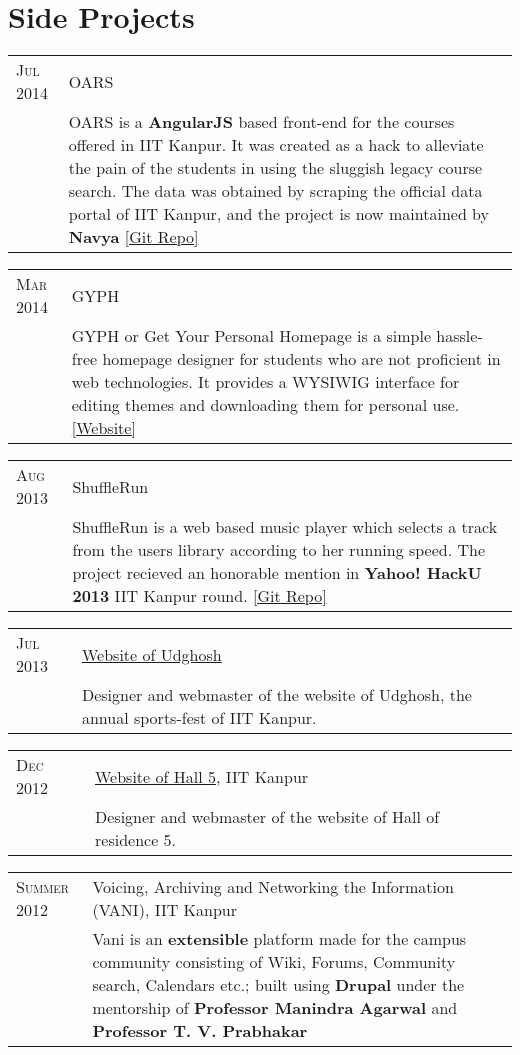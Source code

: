 \documentclass[a4paper,10pt]{article} %
\newcommand{\project}[3]{
    \begin{tabular}{>{\raggedleft}p{2.2cm}|p{17cm}}
        \textsc{#1} & \textcolor{NavyBlue}{#2} \\
                    & \footnotesize{#3} \\
    \end{tabular}
}
\begin{document}
\section{Side Projects}

\project {Jul 2014}
         {OARS}
         {OARS is a \textbf{AngularJS} based front-end for the
          courses offered in IIT Kanpur. It was created as a
          hack to alleviate the pain of the students in using the
          sluggish legacy course search. The data was obtained by
          scraping the official data portal of IIT Kanpur, and the
          project is now maintained by \textbf{Navya}
          \href{https://github.com/navya/oars} {[Git Repo]} }

\project {Mar 2014}
         {GYPH}
         {GYPH or Get Your Personal Homepage
          is a simple hassle-free homepage designer for students who are not
          proficient in web technologies. It provides a WYSIWIG
          interface for editing themes and downloading them for personal use.
          \href{http://gyph2.herokuapp.com/} {[Website]} }

\project {Aug 2013}
         {ShuffleRun}
         {ShuffleRun is a web based music player which selects a track from the
          users library according to her running speed.
          The project recieved an honorable mention in \textbf{Yahoo!  HackU 2013} IIT Kanpur round.
          \href{https://github.com/srijanshetty/ShuffleRun} {[Git Repo]}}

\project {Jul 2013}
         {\href{www.udghosh.org}{Website of Udghosh}}
         {Designer and webmaster of the website of Udghosh, the annual sports-fest of IIT Kanpur.}

\project {Dec 2012}
         {\href{http://www.iitk.ac.in/hall5}{Website of Hall 5}, IIT Kanpur }
         {Designer and webmaster of the website of Hall of residence 5.}

\project {Summer 2012}
         {Voicing, Archiving and Networking the Information \textsc{(VANI)}, IIT Kanpur}
         {Vani is an \textbf{extensible} platform
          made for the campus community consisting of Wiki, Forums,
          Community search, Calendars etc.; built using \textbf{Drupal}
          under the mentorship of \textbf{Professor Manindra Agarwal} and
          \textbf{Professor T. V. Prabhakar} }
\end{document}
